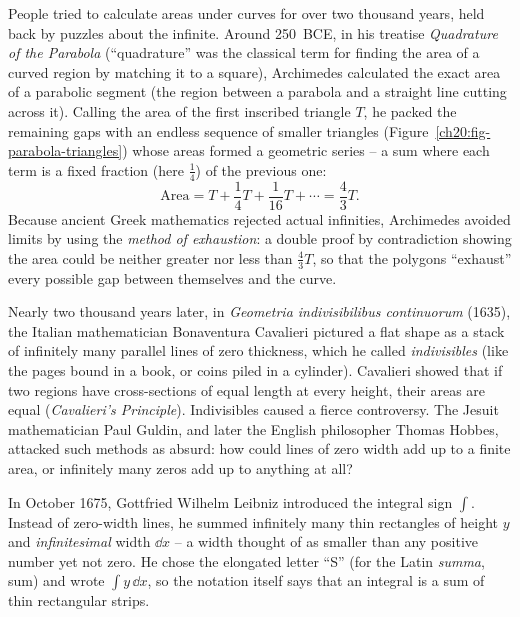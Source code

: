 \begin{historybox}
People tried to calculate areas under curves for over two thousand years, held back by puzzles about the infinite. Around 250~BCE, in his treatise \emph{Quadrature of the Parabola} (``quadrature'' was the classical term for finding the area of a curved region by matching it to a square), Archimedes calculated the exact area of a parabolic segment (the region between a parabola and a straight line cutting across it). Calling the area of the first inscribed triangle $T$, he packed the remaining gaps with an endless sequence of smaller triangles (Figure~\ref{ch20:fig-parabola-triangles}) whose areas formed a geometric series -- a sum where each term is a fixed fraction (here $\tfrac{1}{4}$) of the previous one:
\[
  \text{Area} = T + \frac{1}{4}T + \frac{1}{16}T + \cdots = \frac{4}{3}T.
\]
Because ancient Greek mathematics rejected actual infinities, Archimedes avoided limits by using the \emph{method of exhaustion}: a double proof by contradiction showing the area could be neither greater nor less than $\tfrac{4}{3}T$, so that the polygons ``exhaust'' every possible gap between themselves and the curve.

Nearly two thousand years later, in \emph{Geometria indivisibilibus continuorum} (1635), the Italian mathematician Bonaventura Cavalieri pictured a flat shape as a stack of infinitely many parallel lines of zero thickness, which he called \emph{indivisibles} (like the pages bound in a book, or coins piled in a cylinder). Cavalieri showed that if two regions have cross-sections of equal length at every height, their areas are equal (\emph{Cavalieri's Principle}). Indivisibles caused a fierce controversy. The Jesuit mathematician Paul Guldin, and later the English philosopher Thomas Hobbes, attacked such methods as absurd: how could lines of zero width add up to a finite area, or infinitely many zeros add up to anything at all?

In October 1675, Gottfried Wilhelm Leibniz introduced the integral sign $\int$. Instead of zero-width lines, he summed infinitely many thin rectangles of height $y$ and \emph{infinitesimal} width $\dd x$ -- a width thought of as smaller than any positive number yet not zero. He chose the elongated letter ``S'' (for the Latin \emph{summa}, sum) and wrote $\int y\,\dd x$, so the notation itself says that an integral is a sum of thin rectangular strips.


\end{historybox}
